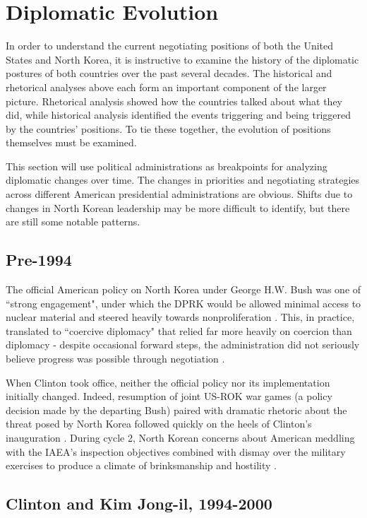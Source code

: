 \chapter{Diplomatic Evolution}

In order to understand the current negotiating positions of both the United States and North Korea, it is instructive to examine the history of the diplomatic postures of both countries over the past several decades. The historical and rhetorical analyses above each form an important component of the larger picture. Rhetorical analysis showed how the countries talked about what they did, while historical analysis identified the events triggering and being triggered by the countries' positions. To tie these together, the evolution of positions themselves must be examined.

This section will use political administrations as breakpoints for analyzing diplomatic changes over time. The changes in priorities and negotiating strategies across different American presidential administrations are obvious. Shifts due to changes in North Korean leadership may be more difficult to identify, but there are still some notable patterns.

\section{Pre-1994}

The official American policy on North Korea under George H.W. Bush was one of ``strong engagement", under which the DPRK would be allowed minimal access to nuclear material and steered heavily towards nonproliferation \cite{cerami}. This, in practice, translated to ``coercive diplomacy" that relied far more heavily on coercion than diplomacy - despite occasional forward steps, the administration did not seriously believe progress was possible through negotiation \cite{sigal}.

When Clinton took office, neither the official policy nor its implementation initially changed. Indeed, resumption of joint US-ROK war games (a policy decision made by the departing Bush) paired with dramatic rhetoric about the threat posed by North Korea followed quickly on the heels of Clinton's inauguration \cite{cumings}. During cycle 2, North Korean concerns about American meddling with the IAEA's inspection objectives combined with dismay over the military exercises to produce a climate of brinksmanship and hostility \cite{cumings}.

\section{Clinton and Kim Jong-il, 1994-2000}

